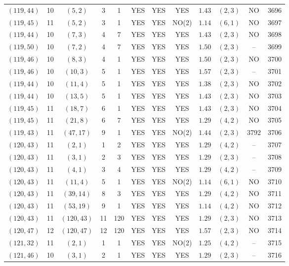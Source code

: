 \begin{longtable}{|c|c|c|c|c|c|c|c|c|c|c|c|}
$(119,44)$ & 10 & $(5,2)$ & 3 & 1 & YES & YES & YES & $1.43$ & $(2,3)$ & NO & 3696\\
$(119,45)$ & 11 & $(5,2)$ & 3 & 1 & YES & YES & NO(2) & $1.14$ & $(6,1)$ & NO & 3697\\
$(119,44)$ & 10 & $(7,3)$ & 4 & 7 & YES & YES & YES & $1.43$ & $(2,3)$ & NO & 3698\\
$(119,50)$ & 10 & $(7,2)$ & 4 & 7 & YES & YES & YES & $1.50$ & $(2,3)$ & -- & 3699\\
$(119,46)$ & 10 & $(8,3)$ & 4 & 1 & YES & YES & YES & $1.50$ & $(2,3)$ & NO & 3700\\
$(119,46)$ & 10 & $(10,3)$ & 5 & 1 & YES & YES & YES & $1.57$ & $(2,3)$ & -- & 3701\\
$(119,44)$ & 10 & $(11,4)$ & 5 & 1 & YES & YES & YES & $1.38$ & $(2,3)$ & NO & 3702\\
$(119,44)$ & 10 & $(13,5)$ & 5 & 1 & YES & YES & YES & $1.43$ & $(2,3)$ & NO & 3703\\
$(119,45)$ & 11 & $(18,7)$ & 6 & 1 & YES & YES & YES & $1.43$ & $(2,3)$ & NO & 3704\\
$(119,45)$ & 11 & $(21,8)$ & 6 & 7 & YES & YES & YES & $1.29$ & $(4,2)$ & NO & 3705\\
$(119,43)$ & 11 & $(47,17)$ & 9 & 1 & YES & YES & NO(2) & $1.44$ & $(2,3)$ & 3792 & 3706\\
$(120,43)$ & 11 & $(2,1)$ & 1 & 2 & YES & YES & YES & $1.29$ & $(4,2)$ & -- & 3707\\
$(120,43)$ & 11 & $(3,1)$ & 2 & 3 & YES & YES & YES & $1.29$ & $(2,3)$ & -- & 3708\\
$(120,43)$ & 11 & $(4,1)$ & 3 & 4 & YES & YES & YES & $1.29$ & $(4,2)$ & -- & 3709\\
$(120,43)$ & 11 & $(11,4)$ & 5 & 1 & YES & YES & NO(2) & $1.14$ & $(6,1)$ & NO & 3710\\
$(120,43)$ & 11 & $(39,14)$ & 8 & 3 & YES & YES & YES & $1.29$ & $(4,2)$ & NO & 3711\\
$(120,43)$ & 11 & $(53,19)$ & 9 & 1 & YES & YES & YES & $1.14$ & $(4,2)$ & NO & 3712\\
$(120,43)$ & 11 & $(120,43)$ & 11 & 120 & YES & YES & YES & $1.29$ & $(2,3)$ & NO & 3713\\
$(120,47)$ & 12 & $(120,47)$ & 12 & 120 & YES & YES & YES & $1.57$ & $(2,3)$ & NO & 3714\\
$(121,32)$ & 11 & $(2,1)$ & 1 & 1 & YES & YES & NO(2) & $1.25$ & $(4,2)$ & -- & 3715\\
$(121,46)$ & 10 & $(3,1)$ & 2 & 1 & YES & YES & YES & $1.29$ & $(2,3)$ & -- & 3716\\

\end{longtable}
